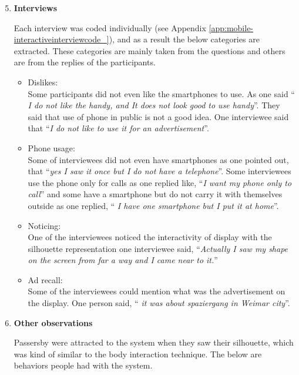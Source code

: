 \begin{enumerate}
\setcounter{enumi}{4}

\item \textbf{Interviews}

Each interview was coded individually (see Appendix \ref{app:mobile-interactiveinterviewcode_}), and as a result the below categories are extracted. These categories are mainly taken from the questions and others are from the replies of the participants. 

\begin{itemize}

\item Dislikes: \\
Some participants did not even like the smartphones to use. As one said ``\emph{ I do not like the handy, and It does not look good to use handy}''. They said that use of phone in public is not a good idea. One interviewee said that ``\emph{I do not like to use it for an advertisement}''. 

\item Phone usage: \\
Some of interviewees did not even have smartphones as one pointed out, that ``\emph{yes I saw it once but I do not have a telephone}''. Some interviewees use the phone only for calls as one replied like, ``\emph{I want my phone only to call}'' and some have a smartphone but do not carry it with themselves outside as one replied, ``\emph{ I have one smartphone but I put it at home}''.

\item Noticing: \\
One of the interviewees noticed the interactivity of display with the silhouette representation one interviewee said, ``\emph{Actually I saw my shape on the screen from far a way and I came near to it.}''

\item Ad recall: \\
Some of the interviewees could mention what was the advertisement on the display. One person said, ``\emph{ it was about spaziergang in Weimar city}''.

\end{itemize}

\item \textbf{Other observations}

Passersby were attracted to the system when they saw their silhouette, which was kind of similar to the body interaction technique. The below are behaviors people had with the system.


\end{enumerate}
